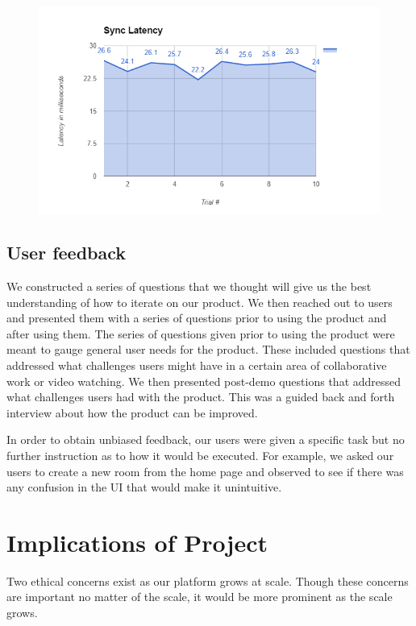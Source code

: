 \documentclass[conference]{IEEEtran}
\begin{document}
    \begin{figure}[H]
      \centering
      \includegraphics[width=\linewidth]{figure4.PNG}
      \caption{}
      \label{fig:my_label}
    \end{figure}

\subsection{User feedback}
    We constructed a series of questions that we thought will give us the best understanding of how to iterate on our product. We then reached out to users and presented them with a series of questions prior to using the product and after using them. The series of questions given prior to using the product were meant to gauge general user needs for the product. These included questions that addressed what challenges users might have in a certain area of collaborative work or video watching. We then presented post-demo questions that addressed what challenges users had with the product. This was a guided back and forth interview about how the product can be improved.

    In order to obtain unbiased feedback, our users were given a specific task but no further instruction as to how it would be executed. For example, we asked our users to create a new room from the home page and observed to see if there was any confusion in the UI that would make it unintuitive.

\section{Implications of Project}

    Two ethical concerns exist as our platform grows at scale. Though these concerns are important no matter of the scale, it would be more prominent as the scale grows.
\end{document}
